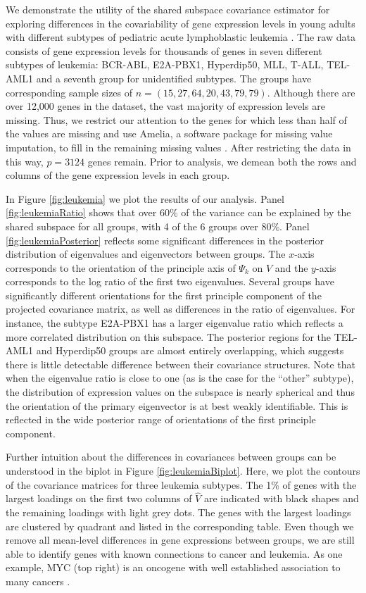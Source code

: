 \documentclass[12pt]{article}
\begin{document}
We demonstrate the utility of the shared subspace covariance
estimator for exploring differences in the covariability of gene
expression levels in young adults with different subtypes of pediatric
acute lymphoblastic leukemia \citep{Yeoh2002}.  The raw data consists
of gene expression levels for thousands of genes in seven different
subtypes of leukemia: BCR-ABL, E2A-PBX1, Hyperdip50, MLL, T-ALL,
TEL-AML1 and a seventh group for unidentified subtypes.  The groups
have corresponding sample sizes of $n = (15, 27, 64, 20, 43, 79, 79)$.
Although there are over 12,000 genes in the dataset, the vast majority of expression
levels are missing.  Thus, we restrict our attention to the genes for
which less than half of the values are missing and use Amelia, a
software package for missing value imputation, to fill in the
remaining missing values \citep{Amelia}.  After restricting the data
in this way, $p=3124$ genes remain.  Prior to analysis, we demean both
the rows and columns of the gene expression levels in each group.

In Figure \ref{fig:leukemia} we plot the results of our analysis.
Panel \ref{fig:leukemiaRatio} shows that over $60\%$ of the variance
can be explained by the  shared subspace for all
groups, with 4 of the 6 groups over 80\%.  Panel
\ref{fig:leukemiaPosterior} reflects some significant differences in
the posterior distribution of eigenvalues and eigenvectors between
groups.  The $x$-axis corresponds to the orientation of the principle
axis of $\Psi_k$ on $V$ and the $y$-axis corresponds to the log ratio of
the first two eigenvalues.  Several groups have significantly
different orientations for the first principle component of the
projected covariance matrix, as well as differences in the ratio of
eigenvalues.  For instance, the subtype E2A-PBX1 has a larger
eigenvalue ratio which reflects a more correlated distribution on this
subspace.  The posterior regions for the TEL-AML1 and Hyperdip50
groups are almost entirely overlapping, which suggests there is little
detectable difference between their covariance structures.  Note that
when the eigenvalue ratio is close to one (as is the case for the
``other'' subtype), the distribution of expression values on the
subspace is nearly spherical and thus the orientation of the primary
eigenvector is at best weakly identifiable.  This is reflected in the
wide posterior range of orientations of the first principle component.

Further intuition about the differences in covariances between groups
can be understood in the biplot in Figure \ref{fig:leukemiaBiplot}.
Here, we plot the contours of the covariance matrices for three
leukemia subtypes. The 1\% of genes with the largest loadings on the
first two columns of $\hat{V}$ are indicated with black shapes and the
remaining loadings with light grey dots.  The genes with the largest
loadings are clustered by quadrant and listed in the corresponding
table.  Even though we remove all mean-level differences in gene
expressions between groups, we are still able to identify genes with
known connections to cancer and leukemia.  As one example, MYC (top
right) is an oncogene with well established association to many
cancers \citep{Dang2012}.
\end{document}
